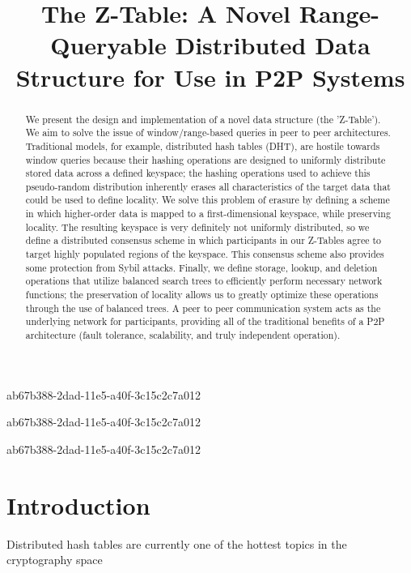 \documentclass[12pt]{article}
\title{The Z-Table: A Novel Range-Queryable Distributed Data Structure for Use in P2P Systems}
\begin{document}
ab67b388-2dad-11e5-a40f-3c15c2c7a012\maketitle
ab67b388-2dad-11e5-a40f-3c15c2c7a012
\begin{abstract}
We present the design and implementation of a novel data structure (the 'Z-Table'). We aim to solve the issue of window/range-based queries in peer to peer architectures. Traditional models, for example,  distributed hash tables (DHT), are hostile towards window queries because their hashing operations are designed to uniformly distribute stored data across a defined keyspace; the hashing operations used to achieve this pseudo-random distribution inherently erases all characteristics of the target data that could be used to define locality. We solve this problem of erasure by defining a scheme in which higher-order data is mapped to a first-dimensional keyspace, while preserving locality. The resulting keyspace is very definitely not uniformly distributed, so we define a distributed consensus scheme in which participants in our Z-Tables agree to target highly populated regions of the keyspace. This consensus scheme also provides some protection from Sybil attacks. Finally, we define storage, lookup, and deletion operations that utilize balanced search trees to efficiently perform necessary network functions; the preservation of locality allows us to greatly optimize these operations through the use of balanced trees. A peer to peer communication system acts as the underlying network for participants, providing all of the traditional benefits of a P2P architecture (fault tolerance, scalability, and truly independent operation).
\end{abstract}


ab67b388-2dad-11e5-a40f-3c15c2c7a012\newpage
\section{Introduction}
Distributed hash tables are currently one of the hottest topics in the cryptography space~\cite{Stoica:2001dj,Rowstron:2001ea,Ratnasamy:2001wn}

\printbibliography
\end{document}
